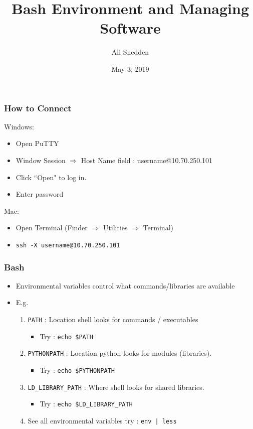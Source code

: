 \documentclass{beamer}
\title{Bash Environment and Managing Software}
\author{Ali Snedden}
\institute{Nationwide Children's Hospital}
\date{May 3, 2019}
\newcommand{\code}[1]{\colorbox{codegray}{\texttt{#1}}}
\begin{document}
 
\frame{\titlepage}




\begin{frame}
\frametitle{How to Connect}
Windows:
\begin{itemize}
    \item Open PuTTY
    \item Window Session $\Rightarrow$ Host Name field : username@10.70.250.101
    \item Click ``Open" to log in.
    \item Enter password
\end{itemize}

Mac:
\begin{itemize}
    \item Open Terminal (Finder $\Rightarrow$ Utilities $\Rightarrow$ Terminal)
    \item \code{ssh -X username@10.70.250.101}
\end{itemize}
\end{frame}



\begin{frame}
\frametitle{Bash}
\begin{itemize}
    \item Environmental variables control what commands/libraries are available
    \pause
    \item E.g.
    \pause
    \begin{enumerate}
        \item \code{PATH} : Location shell looks for commands / executables
            \begin{itemize}
                \item Try : \code{echo \$PATH}
            \end{itemize}
        \pause
        \bigskip
        \item \code{PYTHONPATH} : Location python looks for modules (libraries).
            \begin{itemize}
                \item Try : \code{echo \$PYTHONPATH}
            \end{itemize}
        \bigskip
        \pause
        \item \code{LD\_LIBRARY\_PATH} : Where shell looks for shared libraries.
            \begin{itemize}
                \item Try : \code{echo \$LD\_LIBRARY\_PATH}
            \end{itemize}
        \pause
    \bigskip
    \item See all environmental variables try : \code{env | less}
    \end{enumerate}
\end{itemize}
\end{frame}
\end{document}
